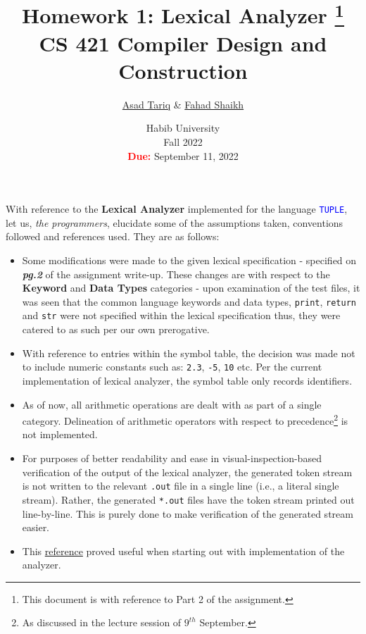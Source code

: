\documentclass[a4paper, 10pt, oneside]{article}
\title{Homework 1: Lexical Analyzer \footnote{This document is with reference to Part 2 of the assignment.}\\CS 421 Compiler Design and Construction}
\author{\href{mailto:at05439@st.habib.edu.pk}{Asad Tariq} \& \href{mailto:fs05452@st.habib.edu.pk}{Fahad Shaikh}}
\date{Habib University\\Fall 2022\\\textbf{\textcolor{red}{Due:}} September 11, 2022}
\begin{document}
\maketitle
\noindent
With reference to the \textbf{Lexical Analyzer} implemented for the language \texttt{\textcolor{blue}{TUPLE}}, let us, \textit{the programmers},
elucidate some of the assumptions taken, conventions followed and references used. They are as follows:
\begin{itemize}
    \item Some modifications were made to the given lexical specification - specified on \emph{\textbf{pg.2}} of the assignment write-up. These changes
    are with respect to the \textbf{Keyword} and \textbf{Data Types} categories - upon examination of the test files, it was seen that the common language
    keywords and data types, \texttt{print}, \texttt{return} and \texttt{str} were not specified within the lexical specification thus, they were catered to
    as such per our own prerogative.
    \item With reference to entries within the symbol table, the decision was made not to include numeric constants such as: \texttt{2.3}, \texttt{-5}, \texttt{10} etc. Per the
    current implementation of lexical analyzer, the symbol table only records identifiers.
    \item As of now, all arithmetic operations are dealt with as part of a single category. Delineation of arithmetic operators with respect to precedence\footnote{As discussed in the lecture session of $9^{th}$ September.} is not implemented.
    \item For purposes of better readability and ease in visual-inspection-based verification of the output of the lexical analyzer, the generated token stream is not written to the relevant \texttt{.out} file
    in a single line (i.e., a literal single stream). Rather, the generated \texttt{*.out} files have the token stream printed out line-by-line. This is purely done 
    to make verification of the generated stream easier. 
    \item This \href{https://austinhenley.com/blog/teenytinycompiler1.html}{reference} proved useful when starting out with implementation of the analyzer.
\end{itemize}
\end{document}
